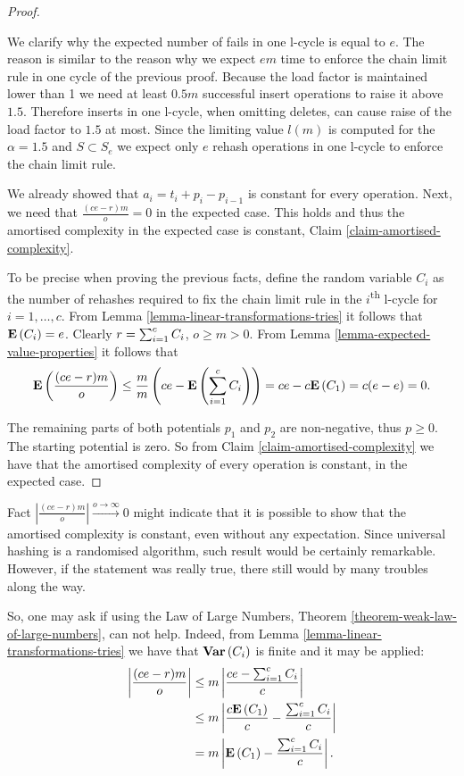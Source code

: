 \begin{proof}
\begin{itemize}
We clarify why the expected number of fails in one l-cycle is equal to $e$. The reason is similar to the reason why we expect $em$ time to enforce the chain limit rule in one cycle of the previous proof. Because the load factor is maintained lower than 1 we need at least $0.5 m$ successful insert operations to raise it above $1.5$. Therefore inserts in one l-cycle, when omitting deletes, can cause raise of the load factor to $1.5$ at most. Since the limiting value $l(m)$ is computed for the $\alpha = 1.5$ and $S \subset S_e$ we expect only $e$ rehash operations in one l-cycle to enforce the chain limit rule.
\end{itemize}

We already showed that $a_i = t_i + p_i - p_{i - 1}$ is constant for every operation. Next, we need that $\frac{(ce - r)m}{o} = 0 $ in the expected case. This holds and thus the amortised complexity in the expected case is constant, Claim \ref{claim-amortised-complexity}.

To be precise when proving the previous facts, define the random variable $C_i$ as the number of rehashes required to fix the chain limit rule in the $i$\textsuperscript{th} l-cycle for $i = 1, \dots, c$. From Lemma \ref{lemma-linear-transformations-tries} it follows that $\mathbf{E}\left(C_i\right) = e$. Clearly $r = \sum\displaylimits_{i = 1}^{c} C_i$, $o \geq m > 0$. From Lemma \ref{lemma-expected-value-properties} it follows that
\[
	\mathbf{E}\left(\frac{(ce - r)m}{o}\right) \leq \frac{m}{m}\left(ce - \mathbf{E}\left(\displaystyle\sum_{i = 1}^{c} C_i\right)\right) = ce - c\mathbf{E}\left(C_1\right) = c(e - e) = 0 \text{.}
\]

The remaining parts of both potentials $p_1$ and $p_2$ are non-negative, thus $p \geq 0$. The starting potential is zero. So from Claim \ref{claim-amortised-complexity} we have that the amortised complexity of every operation is constant, in the expected case.
\end{proof}

Fact $\left|\frac{(ce - r)m}{o}\right| \xrightarrow{o \rightarrow \infty} 0$ might indicate that it is possible to show that the amortised complexity is constant, even without any expectation. Since universal hashing is a randomised algorithm, such result would be certainly remarkable. However, if the statement was really true, there still would by many troubles along the way.

So, one may ask if using the Law of Large Numbers, Theorem \ref{theorem-weak-law-of-large-numbers}, can not help. Indeed, from Lemma \ref{lemma-linear-transformations-tries} we have that $\mathbf{Var}\left(C_i\right)$ is finite and it may be applied:
\[
\begin{split}
\left|\frac{(ce - r)m}{o}\right|
	& \leq m \left|\frac{ce - \sum\displaylimits_{i = 1}^{c} C_i}{c}\right| \\
	& \leq m \left|\frac{c\mathbf{E}\left(C_1\right)}{c} - \frac{\sum\displaylimits_{i = 1}^{c} C_i}{c}\right| \\
	& = m \left|\mathbf{E}\left(C_1\right) - \frac{\sum\displaylimits_{i = 1}^{c} C_i}{c}\right| \text{.}
\end{split}
\]

